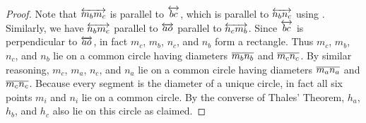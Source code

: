 \begin{proof}
Note that \(\overleftrightarrow{m_bm_c}\) is parallel to \(\overleftrightarrow{bc}\), which is parallel to \(\overleftrightarrow{n_bn_c}\) using .
Similarly, we have \(\overleftrightarrow{n_bm_c}\) parallel to \(\overleftrightarrow{ao}\) parallel to \(\overleftrightarrow{n_cm_b}\).
Since \(\overleftrightarrow{bc}\) is perpendicular to \(\overleftrightarrow{ao}\), in fact \(m_c\), \(m_b\), \(n_c\), and \(n_b\) form a rectangle.
Thus \(m_c\), \(m_b\), \(n_c\), and \(n_b\) lie on a common circle having diameters \(\overline{m_bn_b}\) and \(\overline{m_cn_c}\).
By similar reasoning, \(m_c\), \(m_a\), \(n_c\), and \(n_a\) lie on a common circle having diameters \(\overline{m_an_a}\) and \(\overline{m_cn_c}\).
Because every segment is the diameter of a unique circle, in fact all six points \(m_i\) and \(n_i\) lie on a common circle.
By the converse of Thales' Theorem, \(h_a\), \(h_b\), and \(h_c\) also lie on this circle as claimed.
\end{proof}
